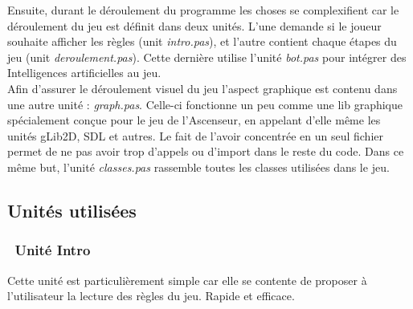 \documentclass[12pt]{report}
\begin{document}
   Ensuite, durant le déroulement du programme les choses se complexifient car le déroulement du jeu est définit dans deux unités. L'une demande si le joueur souhaite afficher les règles (unit \textit{intro.pas}), et l'autre contient chaque étapes du jeu (unit \textit{deroulement.pas}). Cette dernière utilise l'unité \textit{bot.pas} pour intégrer des Intelligences artificielles au jeu. \\
   
 Afin d'assurer le déroulement visuel du jeu l'aspect graphique est contenu dans une autre unité : \textit{graph.pas}. Celle-ci fonctionne un peu comme une lib graphique spécialement conçue pour le jeu de l'Ascenseur, en appelant d'elle même les unités gLib2D, SDL et autres. Le fait de l'avoir concentrée en un seul fichier permet de ne pas avoir trop d'appels ou d'import dans le reste du code. Dans ce même but, l'unité \textit{classes.pas} rassemble toutes les classes utilisées dans le jeu.
 \clearpage
   
   \subsection{Unités utilisées}

   	\subsubsection{\cdot ~Unité Intro}
   	Cette unité est particulièrement simple car elle se contente de proposer à l'utilisateur la lecture des règles du jeu. Rapide et efficace.
   	
\end{document}
